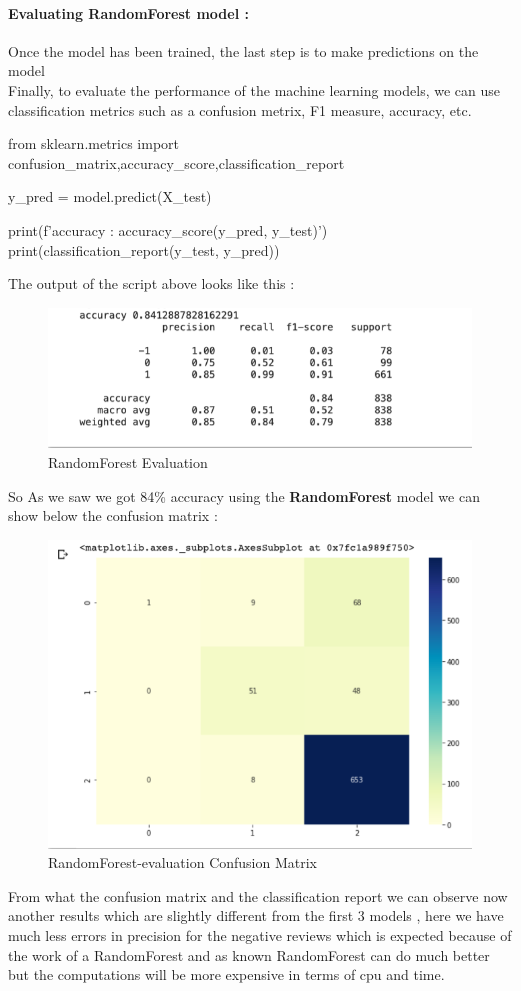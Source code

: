 \documentclass{article}
\begin{document}
\paragraph{ Evaluating RandomForest model :}
Once the model has been trained, the last step is to make predictions on the model \\
Finally, to evaluate the performance of the machine learning models, we can use classification metrics such as a confusion metrix, F1 measure, accuracy, etc.
\begin{code}
from sklearn.metrics import confusion_matrix,accuracy_score,classification_report

y_pred = model.predict(X_test)

print(f'accuracy : {accuracy_score(y_pred, y_test)}')
print(classification_report(y_test, y_pred))

\end{code}
The output of the script above looks like this :
\begin{figure}[H]
    \centering
    \includegraphics[scale=0.55]{src/img/rand_acc.png}
    \caption{RandomForest Evaluation}
    \label{fig:my_label}
\end{figure}
So As we saw we got 84\% accuracy using the \textbf{RandomForest} model we can show below the confusion matrix :
\begin{figure}[H]
    \centering
    \includegraphics[scale=0.4]{src/img/rand_cm.png}
    \caption{RandomForest-evaluation Confusion Matrix}
    \label{fig:my_label}
\end{figure}
From what the confusion matrix and the classification report we can observe now another results which are slightly different from the first 3 models , here we have much less errors in precision for the negative reviews which is expected because of the work of a RandomForest and as known RandomForest can do much better but the computations will be more expensive in terms of cpu and time.
\end{document}
